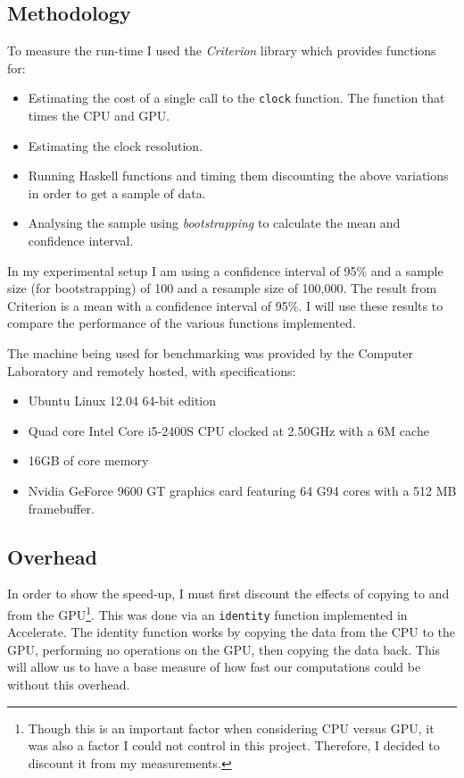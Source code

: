 \documentclass[
    12pt,
    a4paper,
    twoside,
    openright,
    ]{scrbook}
\begin{document}
\subsection{Methodology}

To measure the run-time I used the \emph{Criterion} library\cite{criterion}
which provides functions for:

\begin{itemize}
\itemsep1pt\parskip0pt
\item Estimating the cost of a single call to the \texttt{clock} function.  The
  function that times the CPU and GPU.
\item Estimating the clock resolution.
\item Running Haskell functions and timing them discounting the above variations
  in order to get a sample of data.
\item Analysing the sample using \emph{bootstrapping}\cite{efron1981} to
  calculate the mean and confidence interval.
\end{itemize}

In my experimental setup I am using a confidence interval of 95\% and a sample
size (for bootstrapping) of 100 and a resample size of 100,000. The result from
Criterion is a mean with a confidence interval of 95\%. I will use these results
to compare the performance of the various functions implemented.

The machine being used for benchmarking was provided by the Computer Laboratory
and remotely hosted, with specifications:

\begin{itemize}
\itemsep1pt\parskip0pt
\item
  Ubuntu Linux 12.04 64-bit edition
\item
  Quad core Intel Core i5-2400S CPU clocked at 2.50GHz with a 6M cache
\item
  16GB of core memory
\item Nvidia GeForce 9600 GT graphics card featuring 64 G94 cores with a 512 MB
  framebuffer.
\end{itemize}

\subsection{Overhead}

In order to show the speed-up, I must first discount the effects of copying to
and from the GPU\footnote{Though this is an important factor when considering
  CPU versus GPU, it was also a factor I could not control in this
  project. Therefore, I decided to discount it from my measurements.}. This was
done via an \texttt{identity} function implemented in Accelerate. The identity
function works by copying the data from the CPU to the GPU, performing no
operations on the GPU, then copying the data back. This will allow us to have a
base measure of how fast our computations could be without this overhead.
\end{document}
